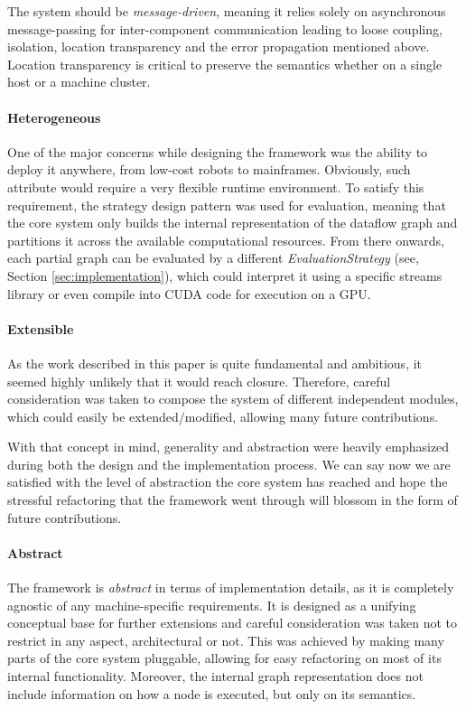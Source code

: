 \documentclass[sigplan,review,anonymous,screen]{acmart}
\begin{document}
The system should be \textit{message-driven}, meaning it relies solely on
asynchronous message-passing for inter-component communication leading to loose
coupling, isolation, location transparency and the error propagation mentioned
above. Location transparency is critical to preserve the semantics whether on a
single host or a machine cluster.

\paragraph{Heterogeneous}
One of the major concerns while designing the framework was the ability to
deploy it anywhere, from low-cost robots to mainframes. Obviously, such
attribute would require a very flexible runtime environment. To satisfy this
requirement, the strategy design pattern was used for evaluation, meaning that
the core system only builds the internal representation of the dataflow graph
and partitions it across the available computational resources. From there
onwards, each partial graph can be evaluated by a different
\textit{EvaluationStrategy} (see, Section \ref{sec:implementation}), which could
interpret it using a specific streams library or even compile into CUDA code for
execution on a GPU.

\paragraph{Extensible}
As the work described in this paper is quite fundamental and ambitious, it
seemed highly unlikely that it would reach closure. Therefore, careful
consideration was taken to compose the system of different independent modules,
which could easily be extended/modified, allowing many future contributions.

With that concept in mind, generality and abstraction were heavily emphasized
during both the design and the implementation process. We can say now we are
satisfied with the level of abstraction the core system has reached and hope the
stressful refactoring that the framework went through will blossom in the form
of future contributions.

\paragraph{Abstract}
The framework is \textit{abstract} in terms of implementation details, as it is
completely agnostic of any machine-specific requirements. It is designed as a
unifying conceptual base for further extensions and careful consideration was
taken not to restrict in any aspect, architectural or not. This was achieved by
making many parts of the core system pluggable, allowing for easy refactoring on
most of its internal functionality. Moreover, the internal graph representation
does not include information on how a node is executed, but only on its
semantics.
\end{document}
